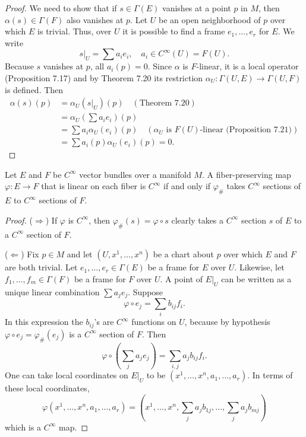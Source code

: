 \begin{example}
\begin{proof}
We need to show that if $s \in \Gamma(E)$ vanishes at a point $p$ in $M$, then $\alpha(s) \in \Gamma(F)$ also vanishes at $p$. Let $U$ be an open neighborhood of $p$ over which $E$ is trivial. Thus, over $U$ it is possible to find a frame $e_1, \dots, e_r$ for $E$. We write
\[
s|_U = \sum a_i e_i, \quad a_i \in C^{\infty}(U) = F(U).
\]
Because $s$ vanishes at $p$, all $a_i(p) = 0$. Since $\alpha$ is $F$-linear, it is a local operator (Proposition 7.17) and by Theorem 7.20 its restriction $\alpha_U : \Gamma(U,E) \to \Gamma(U,F)$ is defined. Then
\begin{align*}
\alpha(s)(p) &= \alpha_U(s|_U)(p) \quad (\text{Theorem 7.20}) \\
&= \alpha_U\left(\sum a_i e_i\right)(p) \\
&= \sum a_i \alpha_U(e_i)(p) \quad (\alpha_U \text{ is } F(U)\text{-linear (Proposition 7.21)}) \\
&= \sum a_i(p) \alpha_U(e_i)(p) = 0.
\end{align*}
\end{proof}

\begin{lemma}
Let $E$ and $F$ be $C^{\infty}$ vector bundles over a manifold $M$. A fiber-preserving map $\varphi : E \to F$ that is linear on each fiber is $C^{\infty}$ if and only if $\varphi_\#$ takes $C^{\infty}$ sections of $E$ to $C^{\infty}$ sections of $F$.
\end{lemma}

\begin{proof}
($\Rightarrow$) If $\varphi$ is $C^{\infty}$, then $\varphi_\#(s) = \varphi \circ s$ clearly takes a $C^{\infty}$ section $s$ of $E$ to a $C^{\infty}$ section of $F$.

($\Leftarrow$) Fix $p \in M$ and let $(U, x^1, \dots, x^n)$ be a chart about $p$ over which $E$ and $F$ are both trivial. Let $e_1, \dots, e_r \in \Gamma(E)$ be a frame for $E$ over $U$. Likewise, let $f_1, \dots, f_m \in \Gamma(F)$ be a frame for $F$ over $U$. A point of $E|_U$ can be written as a unique linear combination $\sum a_j e_j$. Suppose
\[
\varphi \circ e_j = \sum_i b_{ij} f_i.
\]
In this expression the $b_{ij}$'s are $C^{\infty}$ functions on $U$, because by hypothesis $\varphi \circ e_j = \varphi_\#(e_j)$ is a $C^{\infty}$ section of $F$. Then
\[
\varphi \circ \left(\sum_j a_j e_j\right) = \sum_{i,j} a_j b_{ij} f_i.
\]
One can take local coordinates on $E|_U$ to be $(x^1, \dots, x^n, a_1, \dots, a_r)$. In terms of these local coordinates,
\[
\varphi(x^1, \dots, x^n, a_1, \dots, a_r) = \left(x^1, \dots, x^n, \sum_j a_j b_{1j}, \dots, \sum_j a_j b_{mj}\right)
\]
which is a $C^{\infty}$ map.
\end{proof}


\end{example}
